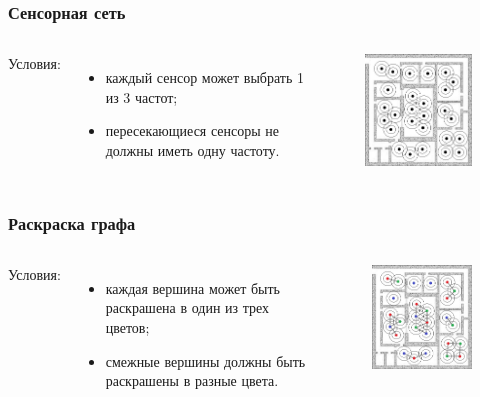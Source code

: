 \documentclass{beamer}
\begin{document}
\begin{frame}
  \frametitle{Сенсорная сеть}
  \begin{columns}[c]
    Условия:
    \begin{itemize}
      \item каждый сенсор может выбрать 1 из 3 частот;
      \item пересекающиеся сенсоры не должны иметь одну частоту.
    \end{itemize}

    \begin{figure}
       \includegraphics[width=5cm]{images/sensors.jpg}
    \end{figure}
  \end{columns}
\end{frame}

\begin{frame}
  \frametitle{Раскраска графа}
  \begin{columns}[c]
    Условия:
    \begin{itemize}
      \item каждая вершина может быть раскрашена в один из трех цветов;
      \item смежные вершины должны быть раскрашены в разные цвета.
    \end{itemize}

    \begin{figure}
       \includegraphics[width=5cm]{images/graph-coloring.jpg}
    \end{figure}
  \end{columns}
\end{frame}
\end{document}
